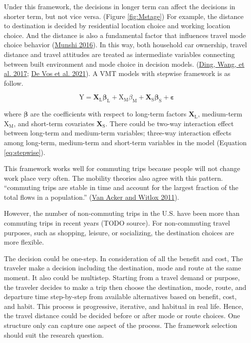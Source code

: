 \documentclass[
  11pt,
  openany]{memoir}
\begin{document}
Under this framework, the decisions in longer term can affect the decisions in shorter term, but not vice versa. (Figure \ref{fig:Mstage})
For example, the distance to destination is decided by residential location choice and working location choice. And the distance is also a fundamental factor that influences travel mode choice behavior (\protect\hyperlink{ref-munshiBuiltEnvironmentMode2016}{Munshi 2016}).
In this way, both household car ownership, travel distance and travel attitudes are treated as intermediate variables connecting between built environment and mode choice in decision models. (\protect\hyperlink{ref-dingExploringInfluenceBuilt2017}{Ding, Wang, et al. 2017}; \protect\hyperlink{ref-devosIndirectEffectBuilt2021}{De Vos et al. 2021}).
A VMT models with stepwise framework is as follow.

\begin{equation}
\label{eq:stepwise}
\mathrm{Y}=\mathbf{X}_\mathrm{L}\boldsymbol{\beta}_\mathrm{L}+\mathrm{X_{M}}{\beta}_\mathrm{M}+\mathbf{X}_\mathrm{S}\boldsymbol{\beta}_\mathrm{S}+\boldsymbol{\varepsilon}
\end{equation}

where \(\boldsymbol{\beta}\) are the coefficients with respect to long-term factors \(\mathbf{X}_\mathrm{L}\), medium-term \(\mathrm{X_{M}}\), and short-term covariates \(\mathbf{X}_\mathrm{S}\).
There could be two-way interaction effect between long-term and medium-term variables; three-way interaction effects among long-term, medium-term and short-term variables in the model (Equation \eqref{eq:stepwise}).

This framework works well for commuting trips because people will not change work place very often. The mobility theories also agree with this pattern.
``commuting trips are stable in time and account for the largest fraction of the total flows in a population.'' (\protect\hyperlink{ref-vanackerCommutingTripsTours2011}{Van Acker and Witlox 2011}).

However, the number of non-commuting trips in the U.S. have been more than commuting trips in recent years (TODO source).
For non-commuting travel purposes, such as shopping, leisure, or socializing, the destination choices are more flexible.

The decision could be one-step. In consideration of all the benefit and cost, The traveler make a decision including the destination, mode and route at the same moment.
It also could be multistep. Starting from a travel demand or purpose, the traveler decides to make a trip then choose the destination, mode, route, and departure time step-by-step from available alternatives based on benefit, cost, and habit.
This process is progressive, iterative, and habitual in real life. Hence, the travel distance could be decided before or after mode or route choices. One structure only can capture one aspect of the process.
The framework selection should suit the research question.
\end{document}
